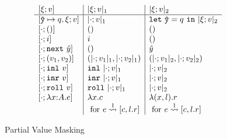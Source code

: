 %

\begin{figure}
\[\begin{array}{l|l|l}
[\xi;v] & \masko{\xi;v} & \maskt{\xi;v} \\ \hline
[\yhat \mapsto q,\xi;v]
  & \masko{\cdot;v}
  & \letin \yhat q {\maskt{\xi;v}} \\\relax
[\cdot;()] 
  & ()
  & () \\\relax
[\cdot;i] 
  & i
  & () \\\relax
[\cdot;\next~\hat y] 
  & ()
  & \hat y \\\relax
[\cdot;(v_1,v_2)] 
  & (\masko {\cdot;v_1},\masko {\cdot;v_2})
  & (\maskt {\cdot;v_1},\maskt {\cdot;v_2}) \\\relax
[\cdot;\inl~v] 
  & \inl~\masko{\cdot;v}
  & \maskt {\cdot;v} \\\relax
[\cdot;\inr~v] 
  & \inr~\masko{\cdot;v}
  & \maskt {\cdot;v} \\\relax
[\cdot;\roll~v] 
  & \roll~\masko{\cdot;v}
  & \maskt {\cdot;v} \\\relax
[\cdot;\lam xAe]
  & \lambda x.c 
  & \lambda (x,l).r \\
& \text{ for } \splitone e A {c,l.r}
& \text{ for } \splitone e A {c,l.r}
\end{array}\]

\caption{Partial Value Masking}
\label{fig:valMask}
\end{figure}

